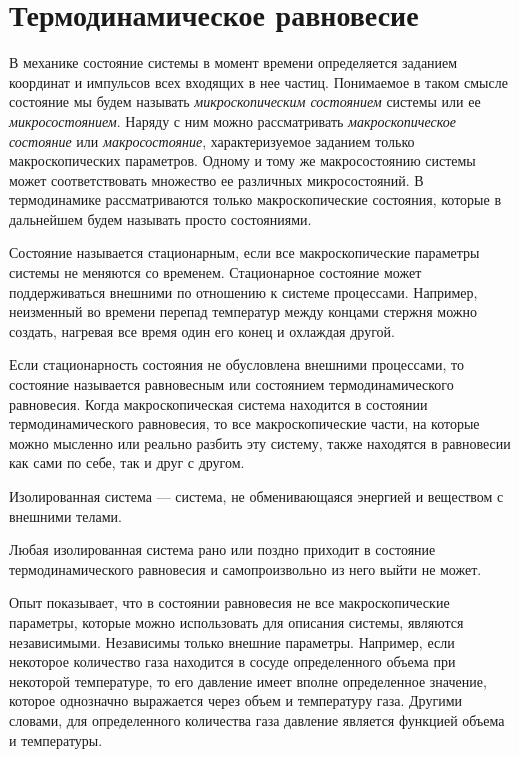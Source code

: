 \section{Термодинамическое равновесие}

	В механике состояние системы в момент времени определяется заданием координат и импульсов всех входящих в нее частиц. Понимаемое в таком смысле состояние мы будем называть \textit{микроскопическим состоянием} системы или ее \textit{микросостоянием}. Наряду с ним можно рассматривать \textit{макроскопическое состояние} или \textit{макросостояние}, характеризуемое заданием только макроскопических параметров. Одному и тому же макросостоянию системы может соответствовать множество ее различных микросостояний. В термодинамике рассматриваются только макроскопические состояния, которые в дальнейшем будем называть просто состояниями. \par
	Состояние называется стационарным, если все макроскопические параметры системы не меняются со временем. Стационарное состояние может поддерживаться внешними по отношению к системе процессами. Например, неизменный во времени перепад температур между концами стержня можно создать, нагревая все время один его конец и охлаждая другой. \par
	Если стационарность состояния не обусловлена внешними процессами, то состояние называется равновесным или состоянием термодинамического равновесия. Когда макроскопическая система находится в состоянии термодинамического равновесия, то все макроскопические части, на которые можно мысленно или реально разбить эту систему, также находятся в равновесии как сами по себе, так и друг с другом.\par
	Изолированная система --- система, не обменивающаяся энергией и веществом с внешними телами.
	\begin{post}
		Любая изолированная система рано или поздно приходит в состояние термодинамического равновесия и самопроизвольно из него выйти не может.
	\end{post}
	Опыт показывает, что в состоянии равновесия не все макроскопические параметры, которые можно использовать для описания системы, являются независимыми. Независимы только внешние параметры. Например, если некоторое количество газа находится в сосуде определенного объема при некоторой температуре, то его давление имеет вполне определенное значение, которое однозначно выражается через объем и температуру газа. Другими словами, для определенного количества газа давление является функцией объема и температуры.